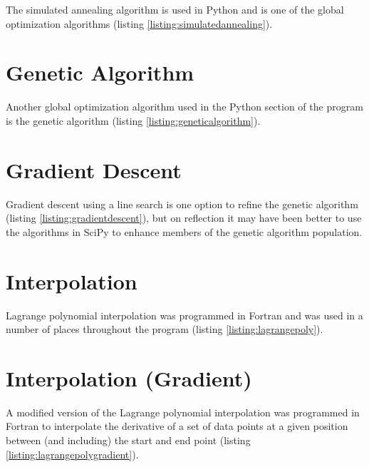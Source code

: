 The simulated annealing algorithm is used in Python and is one of the global optimization algorithms (listing \ref{listing:simulatedannealing}).




\section{Genetic Algorithm}
\label{section:geneticalgorithm}

Another global optimization algorithm used in the Python section of the program is the genetic algorithm (listing \ref{listing:geneticalgorithm}).





\section{Gradient Descent}
\label{section:gradientdescent}

Gradient descent using a line search is one option to refine the genetic algorithm (listing \ref{listing:gradientdescent}), but on reflection it may have been better to use the algorithms in SciPy to enhance members of the genetic algorithm population.





\section{Interpolation}
\label{section:interpolationpseudo}

Lagrange polynomial interpolation was programmed in Fortran and was used in a number of places throughout the program (listing \ref{listing:lagrangepoly}).




\section{Interpolation (Gradient)}
\label{section:interpolationgradientpseudo}

A modified version of the Lagrange polynomial interpolation was programmed in Fortran to interpolate the derivative of a set of data points at a given position between (and including) the start and end point (listing \ref{listing:lagrangepolygradient}).


